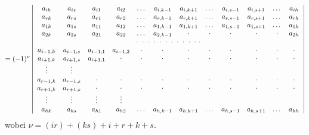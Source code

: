 \documentclass[11pt]{article}
\providecommand{\weberpage}[1]{}
\begin{document}
\weberpage{30}
\[
= (-1)^{\nu}
\left|
\begin{array}{cccccccccccc}
a_{ik} & a_{is} & a_{i1} & a_{i2} & \dots & a_{i,k-1} & a_{i,k+1} & \dots & a_{i,s-1} & a_{i,s+1} & \dots & a_{ih} \\
a_{rk} & a_{rs} & a_{r1} & a_{r2} & \dots & a_{r,k-1} & a_{r,k+1} & \dots & a_{r,s-1} & a_{r,s+1} & \dots & a_{rh} \\
a_{1k} & a_{1s} & a_{11} & a_{12} & \dots & a_{1,k-1} & a_{1,k+1} & \dots & a_{1,s-1} & a_{1,s+1} & \dots & a_{1h} \\
a_{2k} & a_{2s} & a_{21} & a_{22} & \dots & a_{2,k-1} & \cdot & \cdot & \cdot & \cdot & \cdot & a_{2h} \\
\multicolumn{12}{c}{\cdot\ \cdot\ \cdot\ \cdot\ \cdot\ \cdot\ \cdot\ \cdot\ \cdot\ \cdot\ \cdot\ \cdot} \\
a_{i-1,k} & a_{i-1,s} & a_{i-1,1} & a_{i-1,2} & \cdot & \cdot & \cdot & \cdot & \cdot & \cdot & \cdot & \cdot \\
a_{i+1,k} & a_{i+1,s} & a_{i+1,1} & \cdot & \cdot & \cdot & \cdot & \cdot & \cdot & \cdot & \cdot & \cdot \\
\vdots & \vdots & & & & & & & & & & \\
a_{r-1,k} & a_{r-1,s} & \cdot & \cdot & \cdot & \cdot & \cdot & \cdot & \cdot & \cdot & \cdot & \cdot \\
a_{r+1,k} & a_{r+1,s} & \cdot & \cdot & \cdot & \cdot & \cdot & \cdot & \cdot & \cdot & \cdot & \cdot \\
\vdots & \vdots & \vdots & \vdots & & & & & & & & \\
a_{hk} & a_{hs} & a_{h1} & a_{h2} & \dots & a_{h,k-1} & a_{h,k+1} & \dots & a_{h,s-1} & a_{h,s+1} & \dots & a_{hh}
\end{array}
\right|
\]
wobei $\nu = (ir) + (ks) + i + r + k + s.$
\end{document}

